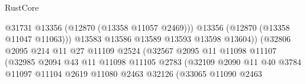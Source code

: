 \begin{lexlean}{RustCore}
\begin{coremodule}
                                                      @31731
                                                      @13356
                                                      (@12870 (@13358 @11057 @2469)))
                                                    @13356
                                                    (@12870 (@13358 @11047 @11063)))
                                                  @13583
                                                  @13586
                                                  @13589
                                                  @13593
                                                  @13598
                                                  @13604))
                                              (@32806
                                                @2095
                                                @214
                                                @11
                                                @27
                                                @11109
                                                @2524
                                                (@32567
                                                  @2095
                                                  @11
                                                  @11098
                                                  @11107
                                                  (@32985
                                                    @2094
                                                    @43
                                                    @11
                                                    @11098
                                                    @11105
                                                    @2783
                                                    (@32109
                                                      @2090
                                                      @11
                                                      @40
                                                      @3784
                                                      @11097
                                                      @11104
                                                      @2619
                                                      @11080
                                                      @2463
                                                      @32126
                                                      (@33065
                                                        @11090
                                                        @2463

\end{coremodule}
\end{lexlean}
